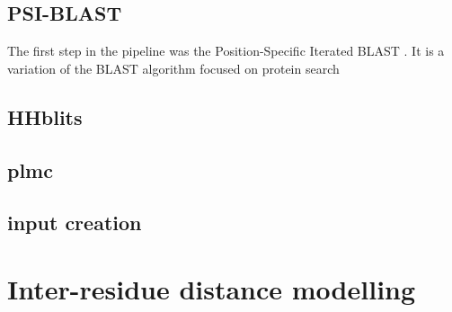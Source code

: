 \subsection{PSI-BLAST}
The first step in the pipeline was the Position-Specific Iterated BLAST \cite{altschul1997gapped}.
It is a variation of the BLAST algorithm focused on protein search


\subsection{HHblits}
\cite{remmert2012hhblits}

\subsection{plmc}
\cite{plmc}

\subsection{input creation}




    
\section{Inter-residue distance modelling}

